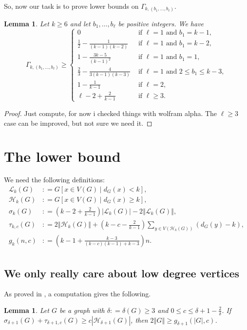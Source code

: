 \documentclass[12pt]{article}
\theoremstyle{plain}
\newtheorem{lem}[thm]{Lemma}
\theoremstyle{definition}
\theoremstyle{remark}
\newcommand{\fancy}[1]{\mathcal{#1}}
\renewcommand{\L}{\fancy{L}}
\newcommand{\HH}{\fancy{H}}
\newcommand{\card}[1]{\left|#1\right|}
\newcommand{\size}[1]{\left\Vert#1\right\Vert}
\newcommand{\parens}[1]{\left( #1 \right)}
\newcommand{\brackets}[1]{\left[ #1 \right]}
\newcommand{\DefinedAs}{\mathrel{\mathop:}=}
\begin{document}
So, now our task is to prove lower bounds on $\Gamma_{k,(b_1,\ldots,b_{\ell})}$.  

\begin{lem}\label{GammaBound}
	Let $k \ge 6$ and let $b_1, \ldots, b_\ell$ be positive integers.  We have
	\[\Gamma_{k,(b_1,\ldots,b_{\ell})} \ge \begin{cases}
	0 & \text{ if } \ell = 1 \text{ and } b_1 = k-1,\\
	\frac12 - \frac{1}{(k-1)(k-2)} & \text{ if } \ell = 1 \text{ and } b_1 = k-2,\\
	1 - \frac{3k-5}{(k-1)^2} & \text{ if } \ell = 1 \text{ and } b_1 = 1,\\
	\frac23 - \frac{4}{3(k-1)(k-3)} & \text{ if } \ell = 1 \text{ and } 2 \le b_1 \le k-3,\\
	1 - \frac{1}{k-1} & \text{ if } \ell = 2,\\
	\ell - 2 + \frac{2}{k-1} & \text{ if } \ell \ge 3.
	\end{cases}\]
\end{lem}
\begin{proof}
	Just compute, for now i checked things with wolfram alpha.  The $\ell \ge 3$ case can be improved, but not sure we need it.
\end{proof}

\section{The lower bound}
We need the following definitions:
\begin{align*}
\L_k(G) &\DefinedAs G\brackets{x \in V(G) \mid d_G(x) < k},\\
\HH_k(G) &\DefinedAs G\brackets{x \in V(G) \mid d_G(x) \ge k},\\
\sigma_k(G) &\DefinedAs \parens{k-2 + \frac{2}{k-1}}\card{\L_k(G)} - 2\size{\L_k(G)},\\
\tau_{k,c}(G) &\DefinedAs 2\size{\HH_k(G)} + \parens{k-c - \frac{2}{k-1}}\sum_{y \in V(\HH_k(G))} \parens{d_G(y) - k},\\
g_k(n, c) &\DefinedAs \parens{k-1 + \frac{k-3}{(k-c)(k-1) + k-3}}n.\\
\end{align*}

\subsection{We only really care about low degree vertices}

\noindent As proved in \cite{kostochkastiebitzedgesincriticalgraph}, a computation gives the following.
\begin{lem}\label{SigmaTauBoundEuler}
Let $G$ be a graph with $\delta \DefinedAs \delta(G) \ge 3$ and $0 \leq c \leq \delta + 1 - \frac{2}{\delta}$.  If $\sigma_{\delta + 1}(G) + \tau_{\delta + 1, c}(G) \ge c\card{\HH_{\delta + 1}(G)}$, then $2\size{G} \ge g_{\delta + 1}(\card{G}, c)$.
\end{lem}
\end{document}
